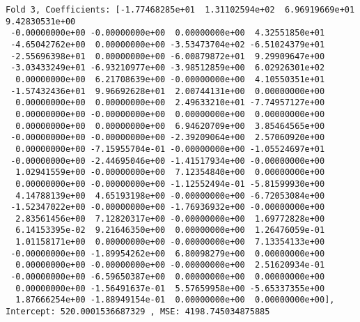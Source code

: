 \documentclass[11pt]{article}
\begin{document}
\begin{Verbatim}[commandchars=\\\{\}]
Fold 3, Coefficients: [-1.77468285e+01  1.31102594e+02  6.96919669e+01  9.42830531e+00
 -0.00000000e+00 -0.00000000e+00  0.00000000e+00  4.32551850e+01
 -4.65042762e+00  0.00000000e+00 -3.53473704e+02 -6.51024379e+01
 -2.55696398e+01  0.00000000e+00 -6.00879872e+01  9.29909647e+00
 -3.03433249e+01 -6.93210977e+00 -3.98512859e+00  6.02926301e+02
  0.00000000e+00  6.21708639e+00 -0.00000000e+00  4.10550351e+01
 -1.57432436e+01  9.96692628e+01  2.00744131e+00  0.00000000e+00
  0.00000000e+00  0.00000000e+00  2.49633210e+01 -7.74957127e+00
  0.00000000e+00 -0.00000000e+00  0.00000000e+00  0.00000000e+00
  0.00000000e+00  0.00000000e+00  6.94620709e+00  3.85464565e+00
 -0.00000000e+00 -0.00000000e+00 -2.39209064e+00  2.57060920e+00
  0.00000000e+00 -7.15955704e-01 -0.00000000e+00 -1.05524697e+01
 -0.00000000e+00 -2.44695046e+00 -1.41517934e+00 -0.00000000e+00
  1.02941559e+00 -0.00000000e+00  7.12354840e+00  0.00000000e+00
  0.00000000e+00 -0.00000000e+00 -1.12552494e-01 -5.81599930e+00
  4.14788139e+00  4.65193198e+00 -0.00000000e+00 -6.72053084e+00
 -1.52347022e+00 -0.00000000e+00 -1.76936932e+00 -0.00000000e+00
  2.83561456e+00  7.12820317e+00 -0.00000000e+00  1.69772828e+00
  6.14153395e-02  9.21646350e+00  0.00000000e+00  1.26476059e-01
  1.01158171e+00  0.00000000e+00 -0.00000000e+00  7.13354133e+00
 -0.00000000e+00 -1.89954262e+00  6.80098279e+00  0.00000000e+00
  0.00000000e+00 -0.00000000e+00 -0.00000000e+00  2.51620934e-01
 -0.00000000e+00 -6.59650387e+00  0.00000000e+00  0.00000000e+00
  0.00000000e+00 -1.56491637e-01  5.57659958e+00 -5.65337355e+00
  1.87666254e+00 -1.88949154e-01  0.00000000e+00  0.00000000e+00], Intercept: 520.0001536687329 , MSE: 4198.745034875885 


\end{Verbatim}
\end{document}
